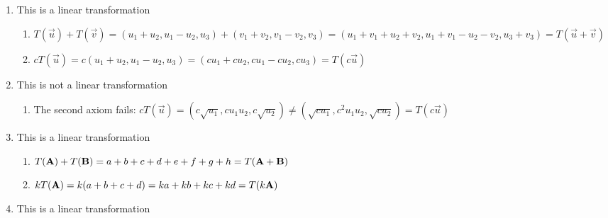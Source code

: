 \documentclass[12pt]{article}
\newcommand{\xmark}{\ding{55}}
\begin{document}
\begin{enumerate}
\begin{enumerate}
    \end{enumerate}

    \setcounter{enumi}{10}

  \item This is a linear transformation

    \begin{enumerate}

      \item $T(\overrightarrow{u})+T(\overrightarrow{v})=(u_1+u_2,u_1-u_2,u_3)+(v_1+v_2,v_1-v_2,v_3)=(u_1+v_1+u_2+v_2, u_1+v_1-u_2-v_2,u_3+v_3)=T(\overrightarrow{u}+\overrightarrow{v})$ \textcolor{green}{\checkmark}

      \item$cT(\overrightarrow{u})=c(u_1+u_2,u_1-u_2,u_3)=(cu_1+cu_2,cu_1-cu_2,cu_3)=T(c\overrightarrow{u})$ \textcolor{green}{\checkmark}

    \end{enumerate}

    \setcounter{enumi}{12}

  \item This is not a linear transformation

    \begin{enumerate}

      \item The second axiom fails: $cT(\overrightarrow{u})=(c\sqrt{u_1},cu_1u_2,c\sqrt{u_2})\neq (\sqrt{cu_1},c^2u_1u_2,\sqrt{cu_2})=T(c\overrightarrow{u})$ \textcolor{red}{\xmark}

    \end{enumerate}

    \setcounter{enumi}{15}

  \item This is a linear transformation

    \begin{enumerate}

      \item $T(\bold{A})+T(\bold{B})=a+b+c+d+e+f+g+h=T(\bold{A}+\bold{B})$ \textcolor{green}{\checkmark}

      \item $kT(\bold{A})=k(a+b+c+d)=ka+kb+kc+kd=T(k\bold{A})$

    \end{enumerate}

    \setcounter{enumi}{18}

  \item This is a linear transformation

    \begin{enumerate}


\end{enumerate}
\end{enumerate}
\end{document}
